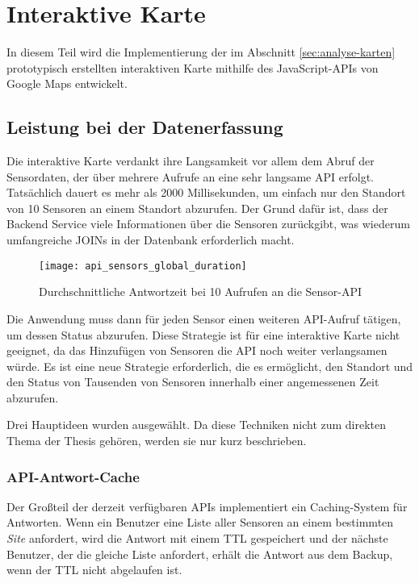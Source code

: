 \section{Interaktive Karte}

In diesem Teil wird die Implementierung der im Abschnitt \ref{sec:analyse-karten} prototypisch erstellten interaktiven Karte mithilfe des JavaScript-APIs von Google Maps entwickelt.

\subsection{Leistung bei der Datenerfassung}

Die interaktive Karte verdankt ihre Langsamkeit vor allem dem Abruf der Sensordaten, der über mehrere Aufrufe an eine sehr langsame API erfolgt.
Tatsächlich dauert es mehr als 2000 Millisekunden, um einfach nur den Standort von 10 Sensoren an einem Standort abzurufen.
Der Grund dafür ist, dass der Backend Service viele Informationen über die Sensoren zurückgibt, was wiederum umfangreiche JOINs in der Datenbank erforderlich macht.

\begin{figure}[H]
  \centering
  \texttt{[image: api\_sensors\_global\_duration]}
  \caption{Durchschnittliche Antwortzeit bei 10 Aufrufen an die Sensor-API}
  \label{fig:api_sensors_global_duration}
\end{figure}

Die Anwendung muss dann für jeden Sensor einen weiteren API-Aufruf tätigen, um dessen Status abzurufen.
Diese Strategie ist für eine interaktive Karte nicht geeignet, da das Hinzufügen von Sensoren die API noch weiter verlangsamen würde.
Es ist eine neue Strategie erforderlich, die es ermöglicht, den Standort und den Status von Tausenden von Sensoren innerhalb einer angemessenen Zeit abzurufen.

Drei Hauptideen wurden ausgewählt.
Da diese Techniken nicht zum direkten Thema der Thesis gehören, werden sie nur kurz beschrieben.

\subsubsection{API-Antwort-Cache}

Der Großteil der derzeit verfügbaren APIs implementiert ein Caching-System für Antworten\cite{redis}.
Wenn ein Benutzer eine Liste aller Sensoren an einem bestimmten \textit{Site} anfordert, wird die Antwort mit einem \ac{TTL} gespeichert und der nächste Benutzer, der die gleiche Liste anfordert, erhält die Antwort aus dem Backup, wenn der \ac{TTL} nicht abgelaufen ist.

